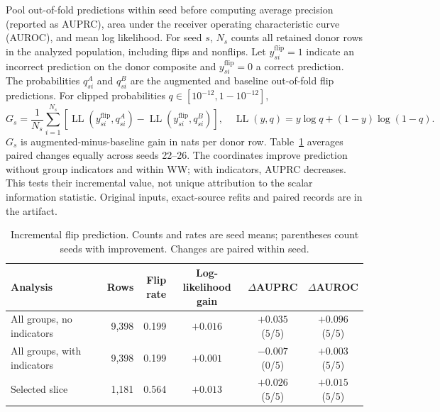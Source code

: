 Pool out-of-fold predictions within seed before computing average precision (reported as AUPRC), area under the receiver operating characteristic curve (AUROC), and mean log likelihood. For seed $s$, $N_s$ counts all retained donor rows in the analyzed population, including flips and nonflips. Let $y^{\mathrm{flip}}_{si}=1$ indicate an incorrect prediction on the donor composite and $y^{\mathrm{flip}}_{si}=0$ a correct prediction. The probabilities $q^A_{si}$ and $q^B_{si}$ are the augmented and baseline out-of-fold flip predictions. For clipped probabilities $q\in[10^{-12},1-10^{-12}]$,
\begin{equation}
G_s=\frac1{N_s}\sum_{i=1}^{N_s}\!\left[\operatorname{LL}(y^{\mathrm{flip}}_{si},q^A_{si})-\operatorname{LL}(y^{\mathrm{flip}}_{si},q^B_{si})\right],\quad
\operatorname{LL}(y,q)=y\log q+(1-y)\log(1-q).
\label{eq:d-flip-loglik-gain}
\end{equation}
$G_s$ is augmented-minus-baseline gain in nats per donor row. Table~\ref{tab:d-flip-prediction} averages paired changes equally across seeds 22--26. The coordinates improve prediction without group indicators and within WW; with indicators, AUPRC decreases. This tests their incremental value, not unique attribution to the scalar information statistic. Original inputs, exact-source refits and paired records are in the artifact.

\begin{table}[htbp]
\centering\small
\setlength{\tabcolsep}{3pt}
\caption{Incremental flip prediction. Counts and rates are seed means; parentheses count seeds with improvement. Changes are paired within seed.}
\label{tab:d-flip-prediction}
\begin{tabular}{@{}p{.24\linewidth}rrccc@{}}
\toprule
Analysis & Rows & \shortstack{Flip\\rate} & \shortstack{Log-likelihood\\gain} & $\Delta$AUPRC & $\Delta$AUROC \\
\midrule
All groups, no indicators & 9,398 & 0.199 & $+0.016$ & $+0.035$ (5/5) & $+0.096$ (5/5) \\
All groups, with indicators & 9,398 & 0.199 & $+0.001$ & $-0.007$ (0/5) & $+0.003$ (5/5) \\
Selected slice & 1,181 & 0.564 & $+0.013$ & $+0.026$ (5/5) & $+0.015$ (5/5) \\
\bottomrule
\end{tabular}
\par\smallskip
\end{table}



